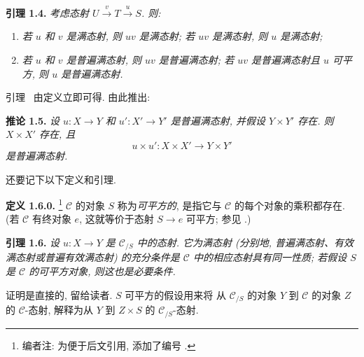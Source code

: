 \medskip
\noindent{}\textbf{引理 1.4.}
\textit{考虑态射 \(U\xrightarrow{v}T\xrightarrow{u}S\). 则:}
\begin{enumerate}
  \item[(a)]
    \textit{若 \(u\) 和 \(v\) 是满态射, 则 \(uv\) 是满态射;
    若 \(uv\) 是满态射, 则 \(u\) 是满态射;}
  \item[(b)]
    \textit{若 \(u\) 和 \(v\) 是普遍满态射, 则 \(uv\) 是普遍满态射;
    若 \(uv\) 是普遍满态射且 \(u\) 可平方, 则 \(u\) 是普遍满态射.}
\end{enumerate}

引理~ 由定义立即可得. 由此推出:

\medskip
\noindent{}\textbf{推论 1.5.}
\textit{设 \(u:X\to Y\) 和 \(u':X'\to Y'\) 是普遍满态射,
并假设 \(Y\times Y'\) 存在. 则 \(X\times X'\) 存在, 且}
\[
  u\times u':X\times X'\longrightarrow Y\times Y'
\]
\textit{是普遍满态射.}

还要记下以下定义和引理.

\medskip
\noindent{}\textbf{定义 1.6.0.}
\footnote{编者注: 为便于后文引用, 添加了编号
.}
\(\mathscr C\) 的对象 \(S\) 称为\emph{可平方的}, 是指它与
\(\mathscr C\) 的每个对象的乘积都存在. (若 \(\mathscr C\)
有终对象 \(e\), 这就等价于态射 \(S\to e\) 可平方;
参见 .)

\medskip
\noindent{}\textbf{引理 1.6.}
\textit{设 \(u:X\to Y\) 是 \(\mathscr C_{/S}\) 中的态射.
它为满态射 (分别地, 普遍满态射、有效满态射或普遍有效满态射)
的充分条件是 \(\mathscr C\) 中的相应态射具有同一性质;
若假设 \(S\) 是 \(\mathscr C\) 的可平方对象, 则这也是必要条件.}

证明是直接的, 留给读者. \(S\) 可平方的假设用来将
从 \(\mathscr C_{/S}\) 的对象 \(Y\) 到 \(\mathscr C\) 的对象 \(Z\)
的 \(\mathscr C\)-态射, 解释为从 \(Y\) 到 \(Z\times S\) 的
\(\mathscr C_{/S}\)-态射.
